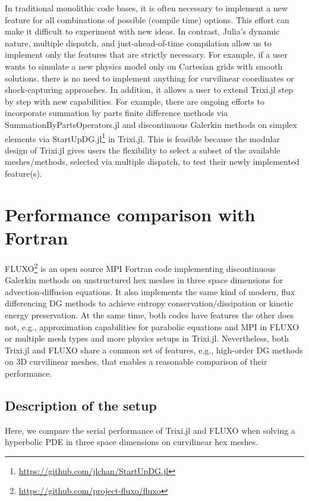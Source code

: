 \documentclass[hidelinks]{juliacon} %
\makeatletter
\newcommand{\eg}[0]{{e.g.\@}\xspace}
\newcommand{\trixi}{Trixi.jl\xspace}
\makeatother
\begin{document}
In traditional monolithic code bases, it is often necessary to implement a new
feature for all combinations of possible (compile time) options. This effort
can make it difficult to experiment with new ideas. In contrast, Julia's dynamic
nature, multiple dispatch, and just-ahead-of-time compilation allow us to implement only the features
that are strictly necessary. For example, if a user wants to simulate a new
physics model only on Cartesian grids with smooth solutions, there is no need
to implement anything for curvilinear coordinates or shock-capturing approaches.
In addition, it allows a user to extend \trixi step by step with new capabilities.
For example, there are ongoing efforts to incorporate summation by parts finite
difference methods via SummationByPartsOperators.jl \cite{ranocha2021sbp} and
discontinuous Galerkin methods on simplex elements via StartUpDG.jl\footnote{\url{https://github.com/jlchan/StartUpDG.jl}} in \trixi.
This is feasible because the modular design of \trixi gives users the flexibility to select
a subset of the available meshes/methods, selected via multiple dispatch,
to test their newly implemented feature(s).



\section{Performance comparison with Fortran}
\label{sec:performance-comparison}

FLUXO\footnote{\url{https://github.com/project-fluxo/fluxo}} is an open source
MPI Fortran code implementing discontinuous Galerkin methods on unstructured hex
meshes in three space dimensions for advection-diffusion equations. It also
implements the same kind of modern, flux differencing DG methods
to achieve entropy conservation/dissipation or kinetic energy preservation.
At the same time, both codes have features the other does not, \eg,
approximation capabilities for parabolic equations and MPI in FLUXO
or multiple mesh types and more physics setups in \trixi. Nevertheless,
both \trixi and FLUXO share a common set of features, \eg, high-order DG
methods on 3D curvilinear meshes, that enables a reasonable comparison of their performance.


\subsection{Description of the setup}

Here, we compare the serial performance of \trixi and FLUXO when solving a
hyperbolic PDE in three space dimensions on curvilinear hex meshes.
\end{document}
